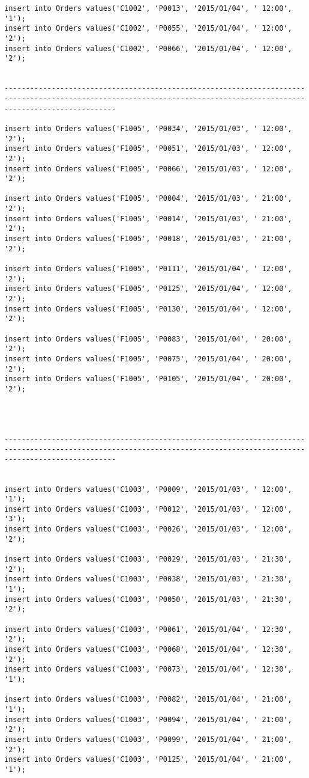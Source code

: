 \documentclass[a4,12pt]{report}
\begin{document}
\begin{lstlisting}
insert into Orders values('C1002', 'P0013', '2015/01/04', ' 12:00', '1');
insert into Orders values('C1002', 'P0055', '2015/01/04', ' 12:00', '2');
insert into Orders values('C1002', 'P0066', '2015/01/04', ' 12:00', '2');


----------------------------------------------------------------------------------------------------------------------------------------------------------------------

insert into Orders values('F1005', 'P0034', '2015/01/03', ' 12:00', '2');
insert into Orders values('F1005', 'P0051', '2015/01/03', ' 12:00', '2');
insert into Orders values('F1005', 'P0066', '2015/01/03', ' 12:00', '2');

insert into Orders values('F1005', 'P0004', '2015/01/03', ' 21:00', '2');
insert into Orders values('F1005', 'P0014', '2015/01/03', ' 21:00', '2');
insert into Orders values('F1005', 'P0018', '2015/01/03', ' 21:00', '2');

insert into Orders values('F1005', 'P0111', '2015/01/04', ' 12:00', '2');
insert into Orders values('F1005', 'P0125', '2015/01/04', ' 12:00', '2');
insert into Orders values('F1005', 'P0130', '2015/01/04', ' 12:00', '2');

insert into Orders values('F1005', 'P0083', '2015/01/04', ' 20:00', '2');
insert into Orders values('F1005', 'P0075', '2015/01/04', ' 20:00', '2');
insert into Orders values('F1005', 'P0105', '2015/01/04', ' 20:00', '2');




----------------------------------------------------------------------------------------------------------------------------------------------------------------------


insert into Orders values('C1003', 'P0009', '2015/01/03', ' 12:00', '1');
insert into Orders values('C1003', 'P0012', '2015/01/03', ' 12:00', '3');
insert into Orders values('C1003', 'P0026', '2015/01/03', ' 12:00', '2');

insert into Orders values('C1003', 'P0029', '2015/01/03', ' 21:30', '2');
insert into Orders values('C1003', 'P0038', '2015/01/03', ' 21:30', '1');
insert into Orders values('C1003', 'P0050', '2015/01/03', ' 21:30', '2');

insert into Orders values('C1003', 'P0061', '2015/01/04', ' 12:30', '2');
insert into Orders values('C1003', 'P0068', '2015/01/04', ' 12:30', '2');
insert into Orders values('C1003', 'P0073', '2015/01/04', ' 12:30', '1');

insert into Orders values('C1003', 'P0082', '2015/01/04', ' 21:00', '1');
insert into Orders values('C1003', 'P0094', '2015/01/04', ' 21:00', '2');
insert into Orders values('C1003', 'P0099', '2015/01/04', ' 21:00', '2');
insert into Orders values('C1003', 'P0125', '2015/01/04', ' 21:00', '1');


\end{lstlisting}
\end{document}
